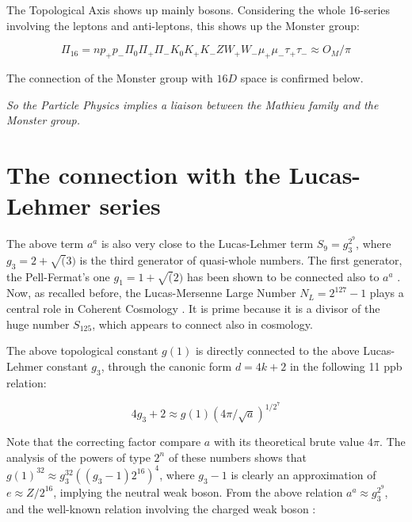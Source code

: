 \documentclass[a4paper,9pt]{article}
\begin{document}
The Topological Axis shows up mainly bosons. Considering the whole 16-series involving the leptons and anti-leptons, this shows up the Monster group:

\begin{equation}
\Pi_{16} = n p_+ p_-  \Pi_0   \Pi_+    \Pi_-  K_0  K_+  K_- Z   W_+  W_- \mu_+ \mu_- \tau_+ \tau_- \approx O_M /\pi
\end{equation}

The connection of the Monster group with $16D$ space is confirmed below.

\textit {So the Particle Physics implies a liaison between the Mathieu family and the Monster group.}












\section{The connection with the Lucas-Lehmer series}

The above term $a^a$ is also very close to the Lucas-Lehmer term $S_9 = g_3^{2^9}$, where $ g_3 = 2 + \sqrt(3)$ is the third generator of quasi-whole numbers. The first generator, the Pell-Fermat's one $g_1 = 1 + \sqrt(2)$ has been shown to be connected also to $a^a$ \cite{Sanchez}. Now, as recalled before, the Lucas-Mersenne Large Number $N_L = 2^{127} - 1$ plays a central role in Coherent Cosmology \cite{Sanchez}. It is prime because it is a divisor of the huge number $S_{125}$, which appears to connect also in cosmology.

The above topological constant $g(1)$ is directly connected to the above Lucas-Lehmer constant $g_3$, through the canonic form $d = 4k+2$ in the following 11 ppb relation:

\begin{equation}
4g_3 +2  \approx g(1) (4\pi/\sqrt a)^{1/2^7} 
\end{equation}

Note that the correcting factor compare $a$ with its theoretical brute value $4\pi$. The analysis of the powers of type $2^n$ of these numbers shows that $g(1)^{32} \approx g_3^{32}((g_3 - 1) 2^{16})^4$, where $g_3 - 1$ is clearly an approximation of $e \approx Z/2^{16}$, implying the neutral weak boson. From the above relation $ a^a \approx g_3^{2^9}$, and the well-known relation involving the charged weak boson \cite{Sanchez}:
\end{document}
